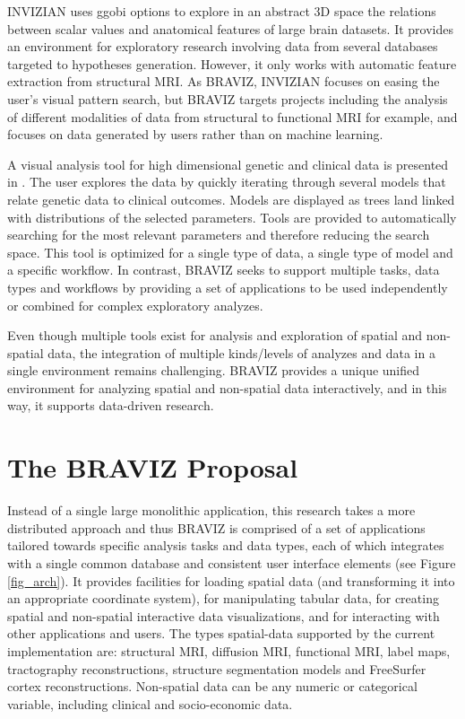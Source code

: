 \documentclass[twocolumn]{svjour3} %
\begin{document}
INVIZIAN \cite{bowman_query-based_2011}\cite{bowman_feature-similarity_2012}\cite{bowman_visual_2012} uses ggobi options to explore in an abstract 3D space the relations between scalar values and anatomical features of large brain datasets. It provides an environment for exploratory research involving data from several databases targeted to hypotheses generation. However, it only works with automatic feature extraction from structural MRI. As BRAVIZ, INVIZIAN focuses on easing the user’s visual pattern search, but BRAVIZ targets projects including the analysis of different modalities of data from structural to functional MRI for example, and focuses on data generated by users rather than on machine learning. 


A visual analysis tool for high dimensional genetic and clinical data is presented in \cite{hinterberg_peax:_2014}. The user explores the data by quickly iterating through several models that relate genetic data to clinical outcomes. Models are displayed as trees land linked with distributions of the selected parameters. Tools are provided to automatically searching for the most relevant parameters and therefore reducing the search space. This tool is optimized for a single type of data, a single type of model and a specific workflow. In contrast, BRAVIZ seeks to support multiple tasks, data types and workflows by providing a set of  applications to be used independently or combined for complex exploratory analyzes.
	
Even though multiple tools  exist for analysis and exploration of spatial and non-spatial data, the integration of multiple kinds/levels of analyzes and data in a single environment remains challenging. BRAVIZ provides a unique unified environment for analyzing spatial and non-spatial data interactively, and in this way, it supports data-driven research.

\section{The BRAVIZ Proposal}

Instead of a single large monolithic application, this research takes a more distributed approach and thus BRAVIZ is comprised of a set of applications tailored towards specific analysis tasks and data types, each of which integrates with a single common database and consistent user interface elements (see Figure \ref{fig_arch}). It provides facilities for loading spatial data (and transforming it into an appropriate coordinate system), for manipulating tabular data, for creating spatial and non-spatial interactive data visualizations, and for interacting with other applications and users. The types spatial-data supported by the current implementation are: structural MRI, diffusion MRI, functional MRI, label maps, tractography reconstructions, structure segmentation models and FreeSurfer cortex reconstructions. Non-spatial data can be any numeric or categorical variable, including clinical and socio-economic data.
\end{document}
